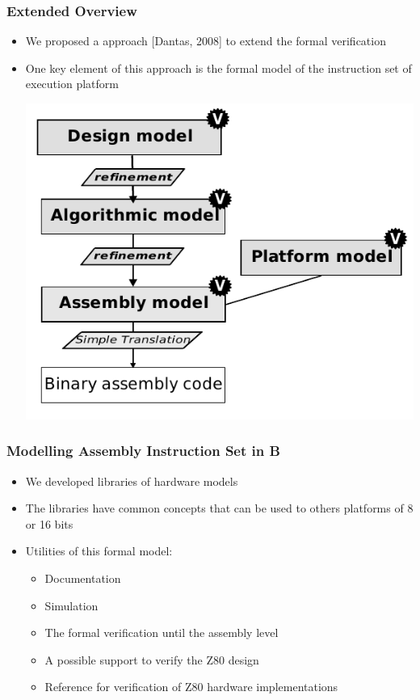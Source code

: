 \begin{frame}
\frametitle{Extended Overview}  

\begin{itemize}%
    \item We proposed a approach [Dantas, 2008] to extend the formal
    verification
    \item One key element of this approach is the formal model of the
    instruction set of execution platform %
     \\ \begin{center}     \includegraphics[height=.5\textheight]{figures/b-method-ideal_new.pdf} \end{center}
\end{itemize}
\end{frame}


\begin{frame}
\frametitle{Modelling Assembly Instruction Set in B}  

\begin{itemize}[<+->]
  \item We developed libraries of hardware models%
  \item The libraries have common concepts that can be used to others platforms of 8 or 16 bits
  \item Utilities of this formal model:
  \begin{itemize}
    \item Documentation
    \item Simulation
    \item The formal verification until the assembly level
    \item A possible support to verify the Z80 design
    	\item Reference for verification of Z80 hardware implementations 

  \end{itemize}
\end{itemize}

\end{frame}


